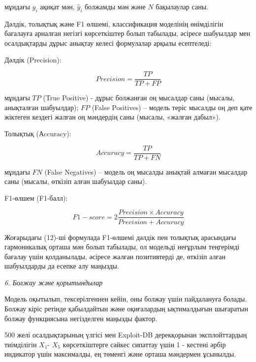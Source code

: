 \begin{multicols}{2}
мұндағы \(y_{i}\) ақиқат мән, \({\hat{y}}_{i}\) болжамды мән және \(N\)
бақылаулар саны.

Дәлдік, толықтық және F1 өлшемі, классификация моделінің өнімділігін
бағалауға арналған негізгі көрсеткіштер болып табылады, әсіресе
шабуылдар мен осалдықтарды дұрыс анықтау келесі формулалар арқылы
есептеледі:

Дәлдік (Precision):

\begin{equation}
Precision = \frac{TP}{TP + FP}
\end{equation}

мұндағы \(TP\) (True Positive) - дұрыс болжанған оң мысалдар саны
(мысалы, анықталған шабуылдар); \(FP\) (False Positives) -- модель теріс
мысалды оң деп қате жіктеген кездегі жалған оң мәндердің саны (мысалы,
«жалған дабыл»).

Толықтық (Аccuracy):

\[Accuracy = \frac{TP}{TP + FN}\]

мұндағы \(FN\) (False Negatives) -- модель оң мысалды анықтай алмаған
мысалдар саны (мысалы, өткізіп алған шабуылдар саны).

F1-өлшем (F1-балл):

\begin{equation}
F1 - score = 2\frac{Precision \times Accuracy}{Precision + Accuracy}
\end{equation}

Жоғарыдағы (12)-ші формулада F1-өлшемі дәлдік пен толықтық арасындағы
гармоникалық орташа мән болып табылады, ол модельді неғұрлым теңгерімді
бағалау үшін қолданылады, әсіресе жалған позитивтерді де, өткізіп алған
шабуылдарды да есепке алу маңызды.

\emph{6. Болжау және қорытындылар}

Модель оқытылып, тексерілгеннен кейін, оны болжау үшін пайдалануға
болады. Болжау кіріс ретінде қабылдайтын және оқиғалардың ықтималдығын
шығаратын болжау функциясына негізделген маңызды фактор.

500 желі осалдықтарының үлгісі мен Exploit-DB дерекқорынан
эксплойттардың тиімділігін \(X_{1}\)- \(X_{5}\) көрсеткіштерге сәйкес
сипаттау үшін 1 - кестені әрбір индикатор үшін максималды, ең төменгі
және орташа мәндермен ұсынылды.
\end{multicols}

